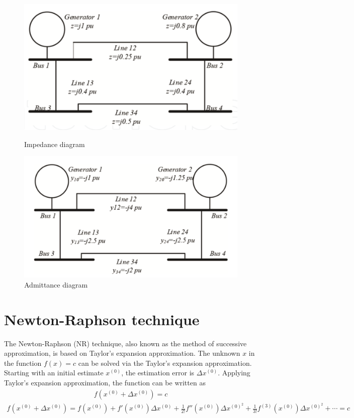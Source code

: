 \documentclass[11pt, oneside, reqno]{amsart}
\numberwithin{equation}{section}
\theoremstyle{plain}%
\theoremstyle{definition}
\theoremstyle{remark}
\begin{document}
\begin{figure}[!ht]
  \centering
  \begin{minipage}[b]{0.5\textwidth}
    \includegraphics[width=\textwidth]{fig2.png}
    \caption[figure 2]{Impedance diagram}
  \end{minipage}
  \hfill
  \begin{minipage}[b]{0.5\textwidth}
    \includegraphics[width=\textwidth]{fig3.png}
    \caption[figure 3]{Admittance diagram}
    \label{fig:eg3}
  \end{minipage}
\end{figure}

\section{Newton-Raphson technique}

The Newton-Raphson (NR) technique, also known as the method of successive approximation, is based on Taylor's expansion approximation. The unknown $x$ in the function $f(x)=c$ can be solved via the Taylor's expansion approximation. Starting with an initial estimate $x^{(0)}$, the estimation error is $\Delta x^{(0)}$. Applying Taylor's expansion approximation, the function can be written as
\begin{align}
	f(x^{(0)}+\Delta x^{(0)})=c
\end{align}
\begin{align}
	f(x^{(0)}+\Delta x^{(0)})=f(x^{(0)})+f'(x^{(0)})\Delta x^{(0)}+\frac{1}{2!}f''(x^{(0)})\Delta x^{(0)^2} +\frac{1}{3!}f^{(3)}(x^{(0)})\Delta x^{(0)^2}+\cdots = c
\end{align}
\end{document}
